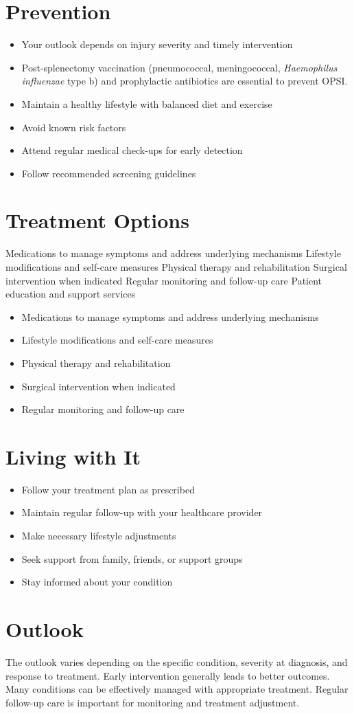 \section{Prevention}
\begin{itemize}[noitemsep]
  \item Your outlook depends on injury severity and timely intervention
  \item Post-splenectomy vaccination (pneumococcal, meningococcal, \textit{Haemophilus influenzae} type b) and prophylactic antibiotics are essential to prevent OPSI.
  \item Maintain a healthy lifestyle with balanced diet and exercise
  \item Avoid known risk factors
  \item Attend regular medical check-ups for early detection
  \item Follow recommended screening guidelines
\end{itemize}
\section{Treatment Options}
Medications to manage symptoms and address underlying mechanisms Lifestyle modifications and self-care measures Physical therapy and rehabilitation Surgical intervention when indicated Regular monitoring and follow-up care Patient education and support services

\begin{itemize}[noitemsep]
  \item Medications to manage symptoms and address underlying mechanisms
  \item Lifestyle modifications and self-care measures
  \item Physical therapy and rehabilitation
  \item Surgical intervention when indicated
  \item Regular monitoring and follow-up care
\end{itemize}
\section{Living with It}
\begin{itemize}[noitemsep]
  \item Follow your treatment plan as prescribed
  \item Maintain regular follow-up with your healthcare provider
  \item Make necessary lifestyle adjustments
  \item Seek support from family, friends, or support groups
  \item Stay informed about your condition
\end{itemize}
\section{Outlook}
The outlook varies depending on the specific condition, severity at diagnosis, and response to treatment. Early intervention generally leads to better outcomes. Many conditions can be effectively managed with appropriate treatment. Regular follow-up care is important for monitoring and treatment adjustment.
